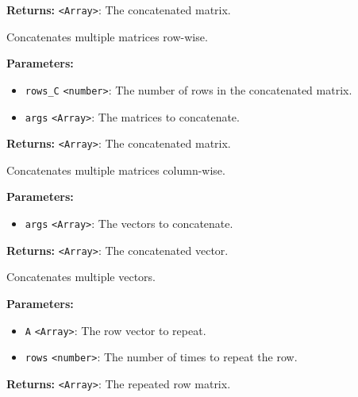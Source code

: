 \documentclass[12pt,a4paper]{article}
\begin{document}
\noindent \textbf{Returns:} \texttt{<Array>}: The concatenated matrix.

\noindent Concatenates multiple matrices row-wise.

\vspace{5mm}
\noindent {}


\noindent \textbf{Parameters:}
\begin{itemize}
  \item \texttt{rows\_C} \texttt{<number>}: The number of rows in the concatenated matrix.
  \item \texttt{args} \texttt{<Array>}: The matrices to concatenate.
\end{itemize}

\noindent \textbf{Returns:} \texttt{<Array>}: The concatenated matrix.

\noindent Concatenates multiple matrices column-wise.

\vspace{5mm}
\noindent {}


\noindent \textbf{Parameters:}
\begin{itemize}
  \item \texttt{args} \texttt{<Array>}: The vectors to concatenate.
\end{itemize}

\noindent \textbf{Returns:} \texttt{<Array>}: The concatenated vector.

\noindent Concatenates multiple vectors.

\vspace{5mm}
\noindent {}


\noindent \textbf{Parameters:}
\begin{itemize}
  \item \texttt{A} \texttt{<Array>}: The row vector to repeat.
  \item \texttt{rows} \texttt{<number>}: The number of times to repeat the row.
\end{itemize}

\noindent \textbf{Returns:} \texttt{<Array>}: The repeated row matrix.
\end{document}
